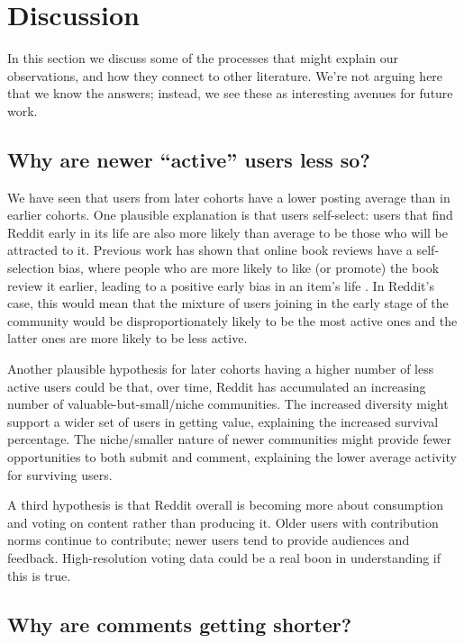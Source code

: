 \section{Discussion}

In this section we discuss some of the processes that might explain our observations, and how they connect to other literature.  We're not arguing here that we know the answers; instead, we see these as interesting avenues for future work.  

\subsection{Why are newer ``active'' users less so?}

We have seen that users from later cohorts have a lower posting average than in earlier cohorts. 
One plausible explanation is that users self-select: users that find Reddit early in its life are also more likely than average to be those who will be attracted to it. Previous work has shown that online book reviews have a self-selection bias, where people who are more likely to like (or promote) the book review it earlier, leading to a positive early bias in an item's life \cite{Li2008}.  In Reddit's case, this would mean that the mixture of users joining in the early stage of the community would be disproportionately likely to be the most active ones and the latter ones are more likely to be less active. 

Another plausible hypothesis for later cohorts having a higher number of less active users could be that, over time, Reddit has accumulated an increasing number of valuable-but-small/niche communities.  The increased diversity might support a wider set of users in getting value, explaining the increased survival percentage.  The niche/smaller nature of newer communities might provide fewer opportunities to both submit and comment, explaining the lower average activity for surviving users. 

A third hypothesis is that Reddit overall is becoming more about consumption and voting on content rather than producing it.  Older users with contribution norms continue to contribute; newer users tend to provide audiences and feedback.  High-resolution voting data could be a real boon in understanding if this is true.

\subsection{Why are comments getting shorter?}

